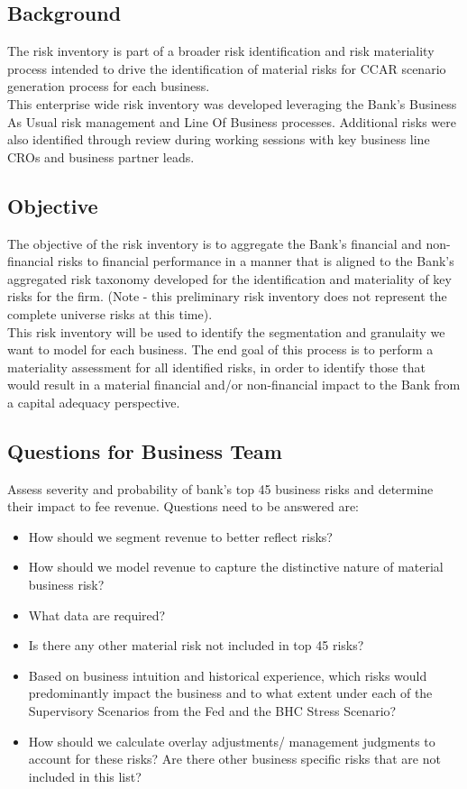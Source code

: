 \subsection{Background}
The risk inventory is part of a broader risk identification and risk materiality
process intended to drive the identification of material risks for CCAR scenario
generation process for each business.\\

This enterprise wide risk inventory was developed leveraging the Bank's Business
As Usual risk management and Line Of Business processes. Additional risks were
also identified through review during working sessions with key business line
CROs and business partner leads.

\subsection{Objective}
The objective of the risk inventory is to aggregate the Bank's financial and
non-financial risks to financial performance in a manner that is aligned to the
Bank's aggregated risk taxonomy developed for the identification and materiality
of key risks for the firm. (Note - this preliminary risk inventory does not
represent the complete universe risks at this time).\\

This risk inventory will be used to identify the segmentation and granulaity we
want to model for each business. The end goal of this process is to perform a
materiality assessment for all identified risks, in order to identify those that
would result in a material financial and/or non-financial impact to the Bank
from a capital adequacy perspective.

\subsection{Questions for Business Team}
Assess severity and probability of bank's top 45 business risks and determine
their impact to fee revenue. Questions need to be answered are:
\begin{itemize}
  \item How should we segment revenue to better reflect risks?
  \item How should we model revenue to capture the distinctive nature of
  material business risk?
  \item What data are required?
  \item	Is there any other material risk not included in top 45 risks?
  \item Based on business intuition and historical experience, which risks would
  predominantly impact the business and to what extent under each of the
  Supervisory Scenarios from the Fed and the BHC Stress Scenario?
  \item How should we calculate overlay adjustments/ management judgments to
  account for these risks? Are there other business specific risks that are not
  included in this list?
\end{itemize}

